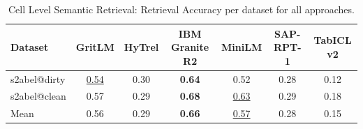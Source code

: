 \begin{table}[t]
\centering
\begin{tabular*}{\textwidth}{lcccccc}
\hline
Dataset & GritLM & HyTrel & IBM Granite R2 & MiniLM & SAP-RPT-1 & TabICL v2 \\
\hline
s2abel@dirty & \underline{0.54} & 0.30 & \textbf{0.64} & 0.52 & 0.28 & 0.12 \\
s2abel@clean & 0.57 & 0.29 & \textbf{0.68} & \underline{0.63} & 0.29 & 0.18 \\
Mean & 0.56 & 0.29 & \textbf{0.66} & \underline{0.57} & 0.28 & 0.15 \\
\hline
\end{tabular*}
\caption{Cell Level Semantic Retrieval: Retrieval Accuracy per dataset for all approaches.}
\label{tab:cell_results}
\end{table}
